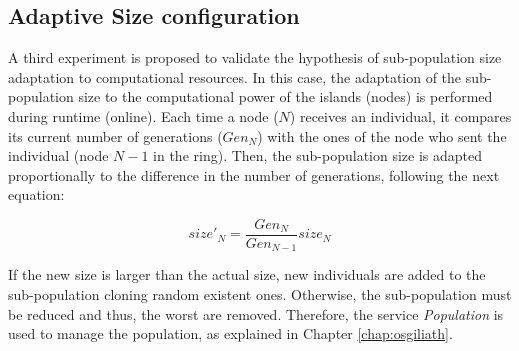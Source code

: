 \subsection{Adaptive Size configuration}

A third experiment is proposed to validate the hypothesis of sub-population 
size adaptation to computational resources. In this case, the adaptation
of the sub-population size to the computational power of the islands
(nodes) is performed during runtime (online). %
  Each time a node ($N$) receives an individual, it compares its
  current number of generations ($Gen_{N}$) with the ones of the node
  who sent the individual (node $N-1$ in the ring). Then, the
  sub-population size is adapted proportionally to the difference in
  the number of generations, following the next equation: %

\begin{equation}
size'_{N}=\dfrac{Gen_{N}}{Gen_{N-1}}size_{N}
\end{equation}

If the new size is larger than the actual size, new individuals are
added to the sub-population cloning random existent ones. %
Otherwise, the sub-population must be reduced and thus, the worst are removed. Therefore, the service {\em Population} is used to manage the population, as explained in Chapter \ref{chap:osgiliath}.

